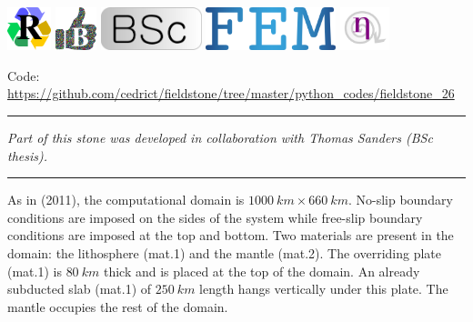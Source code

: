 \includegraphics[height=1.25cm]{images/pictograms/replication}
\includegraphics[height=1.25cm]{images/pictograms/benchmark}
\includegraphics[height=1.25cm]{images/pictograms/bsc}
\includegraphics[height=1.25cm]{images/pictograms/FEM}
\includegraphics[height=1.25cm]{images/pictograms/nonlinear}




\begin{center}
\inpython
{\small Code: \url{https://github.com/cedrict/fieldstone/tree/master/python_codes/fieldstone_26}}
\end{center}


\par\noindent\rule{\textwidth}{0.4pt}

{\sl Part of this stone was developed in collaboration with Thomas Sanders (BSc thesis).} 

\par\noindent\rule{\textwidth}{0.4pt}



As in \textcite{schm11} (2011), the computational domain is $1000~\si{km} \times 660~\si{km}$.
No-slip boundary conditions are imposed on the sides of the system while free-slip
boundary conditions are imposed at the top and bottom.
Two materials are present in the domain: the lithosphere (mat.1) and the mantle (mat.2). 
The overriding plate (mat.1) is $80~\si{km}$ thick and is placed at the top of the domain. 
An already subducted slab (mat.1) of $250~\si{km}$ length hangs vertically under this plate.
The mantle occupies the rest of the domain.

